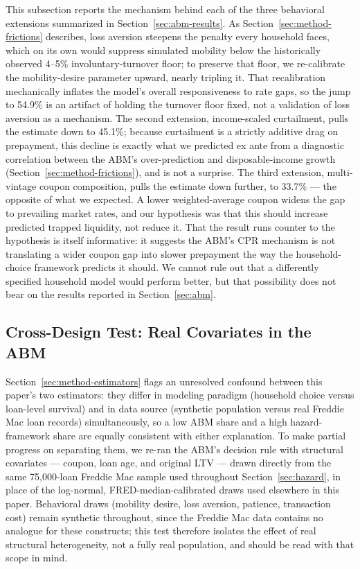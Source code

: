 \documentclass[12pt]{article}
\begin{document}
This subsection reports the mechanism behind each of the three behavioral extensions summarized in Section~\ref{sec:abm-results}. As Section~\ref{sec:method-frictions} describes, loss aversion steepens the penalty every household faces, which on its own would suppress simulated mobility below the historically observed 4--5\% involuntary-turnover floor; to preserve that floor, we re-calibrate the mobility-desire parameter upward, nearly tripling it. That recalibration mechanically inflates the model's overall responsiveness to rate gaps, so the jump to 54.9\% is an artifact of holding the turnover floor fixed, not a validation of loss aversion as a mechanism. The second extension, income-scaled curtailment, pulls the estimate down to 45.1\%; because curtailment is a strictly additive drag on prepayment, this decline is exactly what we predicted ex ante from a diagnostic correlation between the ABM's over-prediction and disposable-income growth (Section~\ref{sec:method-frictions}), and is not a surprise. The third extension, multi-vintage coupon composition, pulls the estimate down further, to 33.7\% --- the opposite of what we expected. A lower weighted-average coupon widens the gap to prevailing market rates, and our hypothesis was that this should increase predicted trapped liquidity, not reduce it. That the result runs counter to the hypothesis is itself informative: it suggests the ABM's CPR mechanism is not translating a wider coupon gap into slower prepayment the way the household-choice framework predicts it should. We cannot rule out that a differently specified household model would perform better, but that possibility does not bear on the results reported in Section~\ref{sec:abm}.

\subsection{Cross-Design Test: Real Covariates in the ABM}\label{sec:robustness-crossdesign}

Section~\ref{sec:method-estimators} flags an unresolved confound between this paper's two estimators: they differ in modeling paradigm (household choice versus loan-level survival) and in data source (synthetic population versus real Freddie Mac loan records) simultaneously, so a low ABM share and a high hazard-framework share are equally consistent with either explanation. To make partial progress on separating them, we re-ran the ABM's decision rule with structural covariates --- coupon, loan age, and original LTV --- drawn directly from the same 75,000-loan Freddie Mac sample used throughout Section~\ref{sec:hazard}, in place of the log-normal, FRED-median-calibrated draws used elsewhere in this paper. Behavioral draws (mobility desire, loss aversion, patience, transaction cost) remain synthetic throughout, since the Freddie Mac data contains no analogue for these constructs; this test therefore isolates the effect of real structural heterogeneity, not a fully real population, and should be read with that scope in mind.
\end{document}
